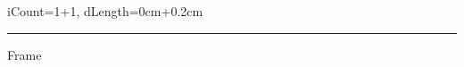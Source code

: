 \documentclass{article}
\begin{document}
\begin{animateinline}{1}
{
	iCount=1+1,
	dLength=0cm+0.2cm
}
{
	\rule{\dLength}{1ex}
	Frame~\iCount
}
\end{animateinline}
\end{document}
